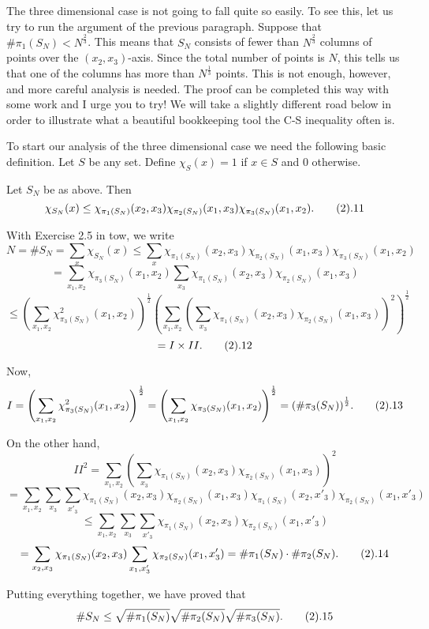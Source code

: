 The three dimensional case is not going to fall quite so easily. To see
this, let us try to run the argument of the previous paragraph. Suppose
that $\# \pi_1(S_N) <N^{\frac{2}{3}}$. This means that $S_N$ consists of
fewer than $N^{\frac{2}{3}}$ columns of points over the $(x_2,x_3)$-axis.
Since the total number of points is $N$, this tells us that one of the
columns has more than $N^{\frac{1}{3}}$ points. This is not enough,
however, and more careful analysis is needed. The proof can be completed
this way with some work and I urge you to try! We will take a slightly
different road below in order to illustrate what a beautiful bookkeeping
tool the C-S inequality often is. 

To start our analysis of the three dimensional case we need the following
basic definition. Let $S$ be any set. Define $\chi_S(x)=1$ if $x \in S$
and $0$ otherwise.

 Let $S_N$ be as above. Then
$$\chi_{S_N}(x) \leq
\chi_{\pi_1(S_N)}(x_2,x_3)\chi_{\pi_2(S_N)}(x_1,x_3)
\chi_{\pi_3(S_N)}(x_1,x_2). \tag2.11$$
\endproclaim

With Exercise 2.5 in tow, we write
$$ N=\# S_N=\sum_{x} \chi_{S_N}(x) \leq
\sum_{x} \chi_{\pi_1(S_N)}(x_2,x_3)\chi_{\pi_2(S_N)}(x_1,x_3)
\chi_{\pi_3(S_N)}(x_1,x_2)$$
$$=\sum_{x_1,x_2} \chi_{\pi_3(S_N)}(x_1,x_2)
\sum_{x_3} \chi_{\pi_1(S_N)}(x_2,x_3)\chi_{\pi_2(S_N)}(x_1,x_3)$$
$$ \leq {\left(\sum_{x_1,x_2}
\chi^2_{\pi_3(S_N)}(x_1,x_2)\right)}^{\frac{1}{2}}
{\left(\sum_{x_1,x_2} {\left(\sum_{x_3}
\chi_{\pi_1(S_N)}(x_2,x_3)\chi_{\pi_2(S_N)}(x_1,x_3)\right)}^2
\right)}^{\frac{1}{2}}$$
$$=I \times II. \tag2.12$$

Now,
$$ I={\left(\sum_{x_1,x_2}
\chi^2_{\pi_3(S_N)}(x_1,x_2)\right)}^{\frac{1}{2}}={\left(\sum_{x_1,x_2}
\chi_{\pi_3(S_N)}(x_1,x_2)\right)}^{\frac{1}{2}}={(\#
\pi_3(S_N))}^{\frac{1}{2}}. \tag2.13$$

On the other hand,
$$ {II}^2=\sum_{x_1,x_2} {\left(\sum_{x_3}
\chi_{\pi_1(S_N)}(x_2,x_3)\chi_{\pi_2(S_N)}(x_1,x_3)\right)}^2$$
$$=\sum_{x_1,x_2} \sum_{x_3} \sum_{x'_3}
\chi_{\pi_1(S_N)}(x_2,x_3)\chi_{\pi_2(S_N)}(x_1,x_3)
\chi_{\pi_1(S_N)}(x_2,x'_3)\chi_{\pi_2(S_N)}(x_1,x'_3)$$
$$ \leq \sum_{x_1,x_2} \sum_{x_3} \sum_{x'_3}
\chi_{\pi_1(S_N)}(x_2,x_3)\chi_{\pi_2(S_N)}(x_1,x'_3)$$
$$=\sum_{x_2,x_3}\chi_{\pi_1(S_N)}(x_2,x_3)
\sum_{x_1,x'_3}\chi_{\pi_2(S_N)}(x_1,x'_3)=\# \pi_1(S_N) \cdot \#
\pi_2(S_N). \tag2.14$$

Putting everything together, we have proved that
$$ \# S_N \leq \sqrt{\# \pi_1(S_N)}\sqrt{\# \pi_2(S_N)}\sqrt{\#
\pi_3(S_N)}. \tag2.15$$

